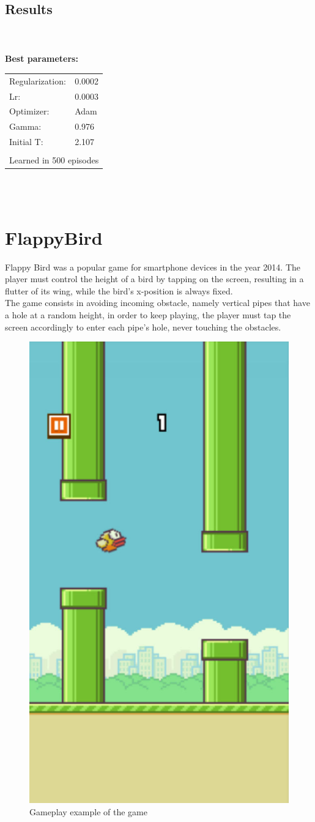 \documentclass[11pt,a4paper,twocolumn]{IEEEtran}
\newcommand{\thinsepline}{\noindent\makebox[\linewidth]{\rule{7.5cm}{0.02pt}}}
\begin{document}
		\subsection{\textbf{Results}}\text{   }\\
		\thinsepline\\
		\textbf{Best parameters:}\medskip\\
		\begin{tabular}{ll}
			Regularization: & 0.0002 \\
			Lr: & 0.0003 \\
			Optimizer: & Adam \\
			Gamma: & 0.976 \\
			Initial T:& 2.107 \\
			\hline\\
			\multicolumn{2}{l}{Learned in 500 episodes}
		\end{tabular}\\
		\thinsepline\medskip\\
		
	\section{\textbf{FlappyBird}}
		Flappy Bird was a popular game for smartphone devices in the year 2014. The player must control the height of a bird by tapping on the screen, resulting in a flutter of its wing, while the bird's x-position is always fixed.\\ The game consists in avoiding incoming obstacle, namely vertical pipes that have a hole at a random height, in order to keep playing, the player must tap the screen accordingly to enter each pipe's hole, never touching the obstacles.
		\begin{figure}[h]
			\centering
			\includegraphics[width=0.35\linewidth]{../imgs/gameplay.jpeg}
			\caption{Gameplay example of the game}
		\end{figure}
\end{document}
